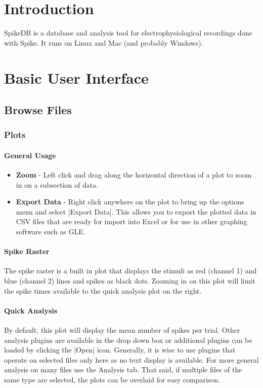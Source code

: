 \documentclass{report}
\begin{document}
\chapter{Introduction}
SpikeDB is a database and analysis tool for electrophysiological recordings done with Spike. It runs on Linux and Mac (and probably Windows).

\chapter{Basic User Interface}
\section{Browse Files}
\subsection{Plots}
\subsubsection{General Usage}
\begin{itemize}
	\item \textbf{Zoom} - Left click and drag along the horizontal direction of a plot to zoom in on a subsection of data.  
	\item \textbf{Export Data} - Right click anywhere on the plot to bring up the options menu and select |Export Data|. This allows you to export the plotted data in CSV files that are ready for import into Excel or for use in other graphing software such as GLE.
\end{itemize}

\subsubsection{Spike Raster}
The spike raster is a built in plot that displays the stimuli as red (channel 1) and blue (channel 2) lines and spikes as black dots. Zooming in on this plot will limit the spike times available to the quick analysis plot on the right.

\subsubsection{Quick Analysis}
By default, this plot will display the mean number of spikes per trial. Other analysis plugins are available in the drop down box or additional plugins can be loaded by clicking the |Open| icon. Generally, it is wise to use plugins that operate on selected files only here as no text display is available. For more general analysis on many files use the Analysis tab. That said, if multiple files of the same type are selected, the plots can be overlaid for easy comparison.
\end{document}
